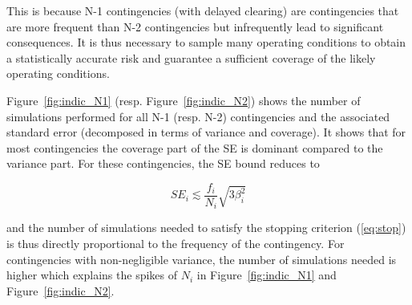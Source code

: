 This is because N-1 contingencies (with delayed clearing) are contingencies that are more frequent than N-2 contingencies but infrequently lead to significant consequences. It is thus necessary to sample many operating conditions to obtain a statistically accurate risk and guarantee a sufficient coverage of the likely operating conditions.

Figure~\ref{fig:indic_N1} (resp. Figure~\ref{fig:indic_N2}) shows the number of simulations performed for all N-1 (resp. N-2) contingencies and the associated standard error (decomposed in terms of variance and coverage). It shows that for most contingencies the coverage part of the SE is dominant compared to the variance part. For these contingencies, the SE bound reduces to

\begin{equation}
  SE_i \lesssim \frac{f_i}{N_i} \sqrt{3 \beta_i^2}
\end{equation}

\noindent and the number of simulations needed to satisfy the stopping criterion (\ref{eq:stop}) is thus directly proportional to the frequency of the contingency. For contingencies with non-negligible variance, the number of simulations needed is higher which explains the spikes of \(N_i\) in Figure~\ref{fig:indic_N1} and Figure~\ref{fig:indic_N2}.


